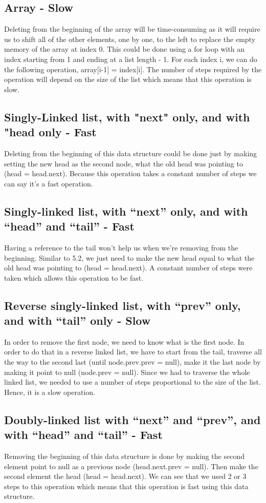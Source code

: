 \documentclass{article}
\begin{document}
\subsection{Array - Slow}
Deleting from the beginning of the array will be time-consuming as it will require us to shift all of the other elements, one by one, to the left to replace the empty memory of the array at index 0. This could be done using a for loop with an index starting from 1 and ending at a list length - 1. For each index i, we can do the following operation, array[i-1] = index[i]. The number of steps required by the operation will depend on the size of the list which means that this operation is slow.

\subsection{Singly-Linked list, with "next" only, and with "head only - Fast}
Deleting from the beginning of this data structure could be done just by making setting the new head as the second node, what the old head was pointing to (head = head.next). Because this operation takes a constant number of steps we can say it's a fast operation.

\subsection{Singly-linked list, with “next” only, and with “head” and “tail” - Fast}
Having a reference to the tail won't help us when we're removing from the beginning. Similar to 5.2, we just need to make the new head equal to what the old head was pointing to (head = head.next). A constant number of steps were taken which allows this operation to be fast.

\subsection{Reverse singly-linked list, with “prev” only, and with “tail” only - Slow}
In order to remove the first node, we need to know what is the first node. In order to do that in a reverse linked list, we have to start from the tail, traverse all the way to the second last (until node.prev.prev = null), make it the last node by making it point to null (node.prev = null). Since we had to traverse the whole linked list, we needed to use a number of steps proportional to the size of the list. Hence, it is a slow operation.

\subsection{Doubly-linked list with “next” and “prev”, and with “head” and “tail” - Fast}
Removing the beginning of this data structure is done by making the second element point to null as a previous node (head.next.prev = null). Then make the second element the head (head = head.next). We can see that we used 2 or 3 steps to this operation which means that this operation is fast using this data structure.
\end{document}
